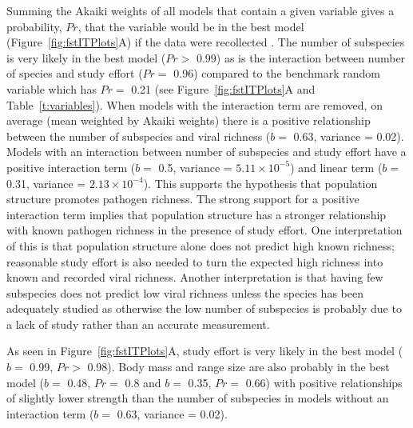 Summing the Akaiki weights of all models that contain a given variable gives a probability, $Pr$, that the variable would be in the best model (Figure~\ref{fig:fstITPlots}A) if the data were recollected \cite{whittingham2006we}.
The number of subspecies is very likely in the best model ($Pr > $ 0.99) as is the interaction between number of species and study effort ($Pr = $ 0.96) compared to the benchmark random variable which has $Pr = $ 0.21 (see Figure~\ref{fig:fstITPlots}A and Table~\ref{t:variables}).
When models with the interaction term are removed, on average (mean weighted by Akaiki weights) there is a positive relationship between the number of subspecies and viral richness ($b = $ 0.63, variance = 0.02).
Models with an interaction between number of subspecies and study effort have a positive interaction term ($b = $ 0.5, variance = \ensuremath{5.11\times 10^{-5}}) and linear term ($b = $ 0.31, variance = \ensuremath{2.13\times 10^{-4}}).
This supports the hypothesis that population structure promotes pathogen richness.
The strong support for a positive interaction term implies that population structure has a stronger relationship with known pathogen richness in the presence of study effort.
One interpretation of this is that population structure alone does not predict high known richness; reasonable study effort is also needed to turn the expected high richness into known and recorded viral richness.
Another interpretation is that having few subspecies does not predict low viral richness unless the species has been adequately studied as otherwise the low number of subspecies is probably due to a lack of study rather than an accurate measurement.


As seen in Figure~\ref{fig:fstITPlots}A, study effort is very likely in the best model ($b = $ 0.99, $Pr > $ 0.98).
Body mass and range size are also probably in the best model ($b = $ 0.48, $Pr = $ 0.8 and $b = $ 0.35, $Pr = $ 0.66) with positive relationships of slightly lower strength than the number of subspecies in models without an interaction term ($b = $ 0.63, variance = 0.02).	



